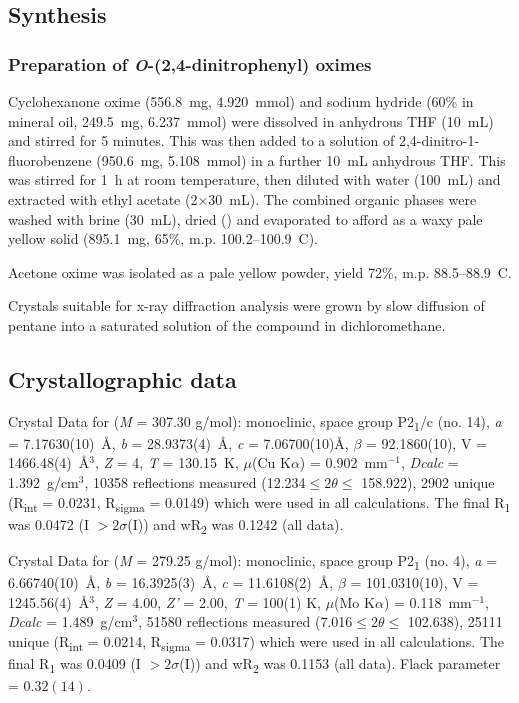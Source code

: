 \begin{refsection}
\subsection{Synthesis}

\subsubsection{Preparation of \emph{O}-(2,4-dinitrophenyl) oximes }
Cyclohexanone oxime (556.8~mg, 4.920~mmol) and sodium hydride (60\% in mineral oil, 249.5~mg, 6.237~mmol) were dissolved in anhydrous THF (10~mL) and stirred for 5 minutes. This was then added to a solution of 2,4-dinitro-1-fluorobenzene (950.6~mg, 5.108~mmol) in a further 10~mL anhydrous THF. This was stirred for 1~h at room temperature, then diluted with water (100~mL) and extracted with ethyl acetate (2$\times$30~mL). The combined organic phases were washed with brine (30~mL), dried () and evaporated to afford  as a waxy pale yellow solid (895.1~mg, 65\%, m.p. 100.2--100.9\degree~C).

Acetone oxime  was isolated as a pale yellow powder, yield 72\%, m.p. 88.5--88.9\degree~C.

Crystals suitable for x-ray diffraction analysis were grown by slow diffusion of pentane into a saturated solution of the compound in dichloromethane.

\subsection{Crystallographic data}
Crystal Data for   (\emph{M} = 307.30 g/mol): monoclinic, space group P2\textsubscript{1}/c (no. 14), \emph{a} = 7.17630(10)~\AA , \emph{b} = 28.9373(4)~\AA , \emph{c} = 7.06700(10)\AA , $\beta$ = 92.1860(10)\degree, V = 1466.48(4)~\AA$^3$, \emph{Z} = 4, \emph{T} = 130.15~K, $\mu$(Cu K$\alpha$) = 0.902~mm$^{-1}$, \emph{Dcalc} = 1.392~g/cm$^3$, 10358 reflections measured (12.234\degree $\leq 2\theta \leq$ 158.922\degree), 2902 unique (R\textsubscript{int} = 0.0231, R\textsubscript{sigma} = 0.0149) which were used in all calculations. The final R\textsubscript{1} was 0.0472 (I $> 2\sigma$(I)) and wR\textsubscript{2} was 0.1242 (all data). 

Crystal Data for   (\emph{M} = 279.25 g/mol): monoclinic, space group P2\textsubscript{1} (no. 4), \emph{a} = 6.66740(10)~\AA, \emph{b} = 16.3925(3)~\AA, \emph{c} = 11.6108(2)~\AA, $\beta$ = 101.0310(10)\degree, V = 1245.56(4)~\AA$^3$, \emph{Z} = 4.00, \emph{Z'} = 2.00, \emph{T} = 100(1) K, $\mu$(Mo K$\alpha$) = 0.118~mm$^{-1}$, \emph{Dcalc} = 1.489~g/cm$^3$, 51580 reflections measured (7.016\degree $\leq 2\theta \leq$ 102.638\degree), 25111 unique (R\textsubscript{int} = 0.0214, R\textsubscript{sigma} = 0.0317) which were used in all calculations. The final R\textsubscript{1} was 0.0409 (I $> 2\sigma$(I)) and wR\textsubscript{2} was 0.1153 (all data). Flack parameter = $0.32(14)$.


\end{refsection}
